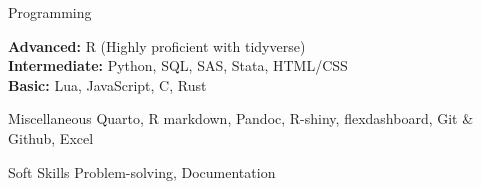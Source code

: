 

\begin{cvskills}

  \cvskill
    {Programming} %
    {\parbox{8cm}{\textbf{Advanced:} R (Highly proficient with tidyverse) \\ \textbf{Intermediate:} Python, SQL, SAS, Stata, HTML/CSS \\ \textbf{Basic:} Lua, JavaScript, C, Rust \\ \vspace{1mm}}} %

  \cvskill
    {Miscellaneous} %
    {Quarto, R markdown, Pandoc, R-shiny, flexdashboard, Git \& Github, Excel} %
    
  \cvskill
    {Soft Skills} %
    {Problem-solving, Documentation} %

\end{cvskills}
